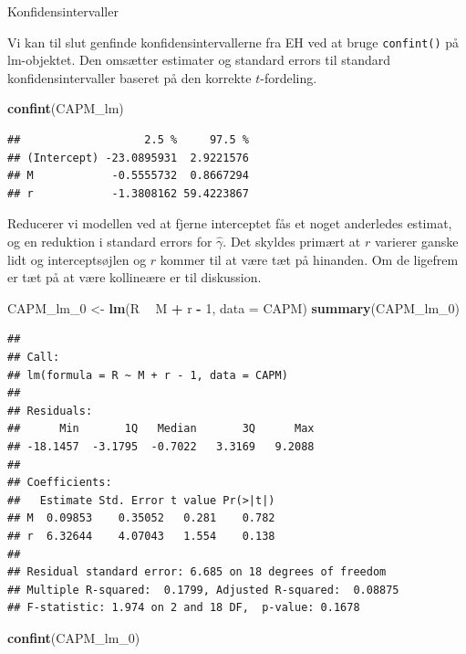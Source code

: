\documentclass[
]{article}
\newenvironment{Shaded}{\begin{snugshade}}{\end{snugshade}}
\newcommand{\DataTypeTok}[1]{\textcolor[rgb]{0.13,0.29,0.53}{#1}}
\newcommand{\DecValTok}[1]{\textcolor[rgb]{0.00,0.00,0.81}{#1}}
\newcommand{\KeywordTok}[1]{\textcolor[rgb]{0.13,0.29,0.53}{\textbf{#1}}}
\newcommand{\NormalTok}[1]{#1}
\newcommand{\OperatorTok}[1]{\textcolor[rgb]{0.81,0.36,0.00}{\textbf{#1}}}
\newcommand{\StringTok}[1]{\textcolor[rgb]{0.31,0.60,0.02}{#1}}
\begin{document}
Konfidensintervaller

Vi kan til slut genfinde konfidensintervallerne fra EH ved at bruge
\texttt{confint()} på lm-objektet. Den omsætter estimater og standard
errors til standard konfidensintervaller baseret på den korrekte
\(t\)-fordeling.

\begin{Shaded}
\begin{Highlighting}[]
\KeywordTok{confint}\NormalTok{(CAPM_lm)}
\end{Highlighting}
\end{Shaded}

\begin{verbatim}
##                   2.5 %     97.5 %
## (Intercept) -23.0895931  2.9221576
## M            -0.5555732  0.8667294
## r            -1.3808162 59.4223867
\end{verbatim}

Reducerer vi modellen ved at fjerne interceptet fås et noget anderledes
estimat, og en reduktion i standard errors for \(\hat{\gamma}\). Det
skyldes primært at \(r\) varierer ganske lidt og interceptsøjlen og
\(r\) kommer til at være tæt på hinanden. Om de ligefrem er tæt på at
være kollineære er til diskussion.

\begin{Shaded}
\begin{Highlighting}[]
\NormalTok{CAPM_lm_}\DecValTok{0}\NormalTok{ <-}\StringTok{ }\KeywordTok{lm}\NormalTok{(R }\OperatorTok{~}\StringTok{ }\NormalTok{M }\OperatorTok{+}\StringTok{ }\NormalTok{r }\OperatorTok{-}\StringTok{ }\DecValTok{1}\NormalTok{, }\DataTypeTok{data =}\NormalTok{ CAPM)}
\KeywordTok{summary}\NormalTok{(CAPM_lm_}\DecValTok{0}\NormalTok{)}
\end{Highlighting}
\end{Shaded}

\begin{verbatim}
## 
## Call:
## lm(formula = R ~ M + r - 1, data = CAPM)
## 
## Residuals:
##      Min       1Q   Median       3Q      Max 
## -18.1457  -3.1795  -0.7022   3.3169   9.2088 
## 
## Coefficients:
##   Estimate Std. Error t value Pr(>|t|)
## M  0.09853    0.35052   0.281    0.782
## r  6.32644    4.07043   1.554    0.138
## 
## Residual standard error: 6.685 on 18 degrees of freedom
## Multiple R-squared:  0.1799, Adjusted R-squared:  0.08875 
## F-statistic: 1.974 on 2 and 18 DF,  p-value: 0.1678
\end{verbatim}

\begin{Shaded}
\begin{Highlighting}[]
\KeywordTok{confint}\NormalTok{(CAPM_lm_}\DecValTok{0}\NormalTok{)}
\end{Highlighting}
\end{Shaded}
\end{document}
